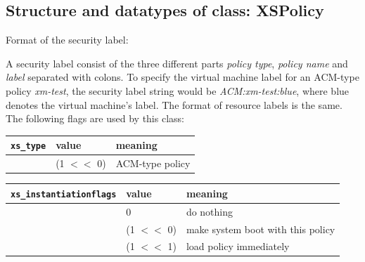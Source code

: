 \subsection{Structure and datatypes of class: XSPolicy}

Format of the security label:

A security label consist of the three different parts {\it policy type},
{\it policy name} and {\it label} separated with colons. To specify
the virtual machine label for an ACM-type policy {\it xm-test}, the
security label string would be {\it ACM:xm-test:blue}, where blue
denotes the virtual machine's label. The format of resource labels is
the same.\\[0.5cm]
The following flags are used by this class:

\begin{longtable}{|l|l|l|}
\hline
{\tt xs\_type} & value & meaning \\
\hline
\hspace{0.5cm}{\tt XS\_POLICY\_ACM} & (1 $<<$ 0) & ACM-type policy \\
\hline
\end{longtable}

\begin{longtable}{|l|l|l|}
\hline
{\tt xs\_instantiationflags} & value & meaning \\
\hline
\hspace{0.5cm}{\tt XS\_INST\_NONE} & 0 & do nothing \\
\hspace{0.5cm}{\tt XS\_INST\_BOOT} & (1 $<<$ 0) & make system boot with this policy \\
\hspace{0.5cm}{\tt XS\_INST\_LOAD} & (1 $<<$ 1) & load policy immediately \\
\hline
\end{longtable}

